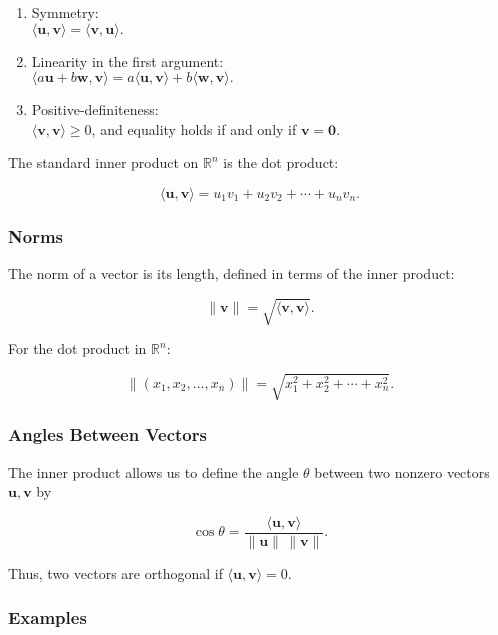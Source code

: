 \documentclass[
  12pt,
  a4paper,
]{article}
\begin{document}
\begin{enumerate}
\def\labelenumi{\arabic{enumi}.}
\item
  Symmetry:\\
  \(\langle \mathbf{u}, \mathbf{v} \rangle = \langle \mathbf{v}, \mathbf{u} \rangle.\)
\item
  Linearity in the first argument:\\
  \(\langle a\mathbf{u} + b\mathbf{w}, \mathbf{v} \rangle = a \langle \mathbf{u}, \mathbf{v} \rangle + b \langle \mathbf{w}, \mathbf{v} \rangle.\)
\item
  Positive-definiteness:\\
  \(\langle \mathbf{v}, \mathbf{v} \rangle \geq 0\), and equality holds
  if and only if \(\mathbf{v} = \mathbf{0}\).
\end{enumerate}

The standard inner product on \(\mathbb{R}^n\) is the dot product:

\[\langle \mathbf{u}, \mathbf{v} \rangle = u_1 v_1 + u_2 v_2 + \cdots + u_n v_n.\]

\subsubsection{Norms}\label{norms}

The norm of a vector is its length, defined in terms of the inner
product:

\[\|\mathbf{v}\| = \sqrt{\langle \mathbf{v}, \mathbf{v} \rangle}.\]

For the dot product in \(\mathbb{R}^n\):

\[\|(x_1, x_2, \dots, x_n)\| = \sqrt{x_1^2 + x_2^2 + \cdots + x_n^2}.\]

\subsubsection{Angles Between Vectors}\label{angles-between-vectors-2}

The inner product allows us to define the angle \(\theta\) between two
nonzero vectors \(\mathbf{u}, \mathbf{v}\) by

\[\cos \theta = \frac{\langle \mathbf{u}, \mathbf{v} \rangle}{\|\mathbf{u}\| \, \|\mathbf{v}\|}.\]

Thus, two vectors are orthogonal if
\(\langle \mathbf{u}, \mathbf{v} \rangle = 0\).

\subsubsection{Examples}\label{examples-6}
\end{document}
